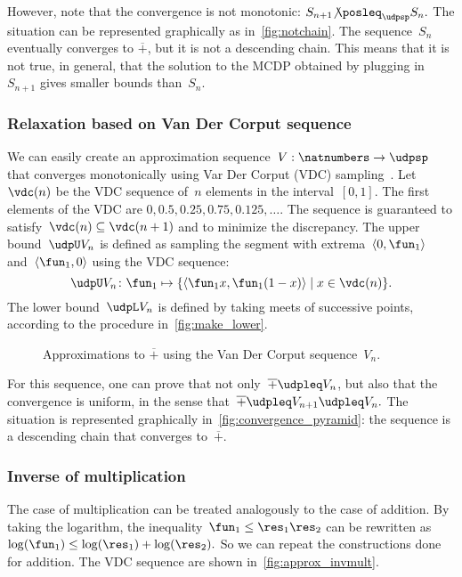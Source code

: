 However, note that the convergence is not monotonic: $S_{n+1}{\not\posleq}_{\udpsp}S_{n}.
$
The situation can be represented graphically as in~\cref{fig:notchain}.
The sequence~$S_{n}$ eventually converges to $\overline{+}$, but
it is not a descending chain.
This means that it is not true, in general,
that the solution to the MCDP obtained by plugging in~$S_{n+1}$
gives smaller bounds than~$S_{n}$.

\subsubsection*{Relaxation based on Van Der Corput sequence}

We can easily create an approximation sequence~$V:\natnumbers\to\udpsp$
that converges monotonically using Var Der Corput (VDC) sampling~\cite[Section 5.2]{LaValle2006Planning}.
Let~$\vdc(n)$ be the VDC sequence of~$n$ elements in the interval~$[0,1]$.
The first elements of the VDC are $0,0.5,0.25,0.75,0.125,\dots$.
The sequence is guaranteed to satisfy~$\vdc(n)\subseteq\vdc(n+1)$
and to minimize the discrepancy.
The upper bound~$\udpU V_{n}$
is defined as sampling the segment with extrema~$\left\langle 0,\fun_{1}\right\rangle $
and~$\left\langle \fun_{1},0\right\rangle $ using the VDC sequence:
\[
	\udpU V_{n}\colon\fun_{1}\mapsto\{\left\langle \fun_{1}x,\fun_{1}(1-x)\right\rangle \mid x\in\vdc(n)\}.
\]
The lower bound~$\udpL V_{n}$ is defined by taking meets of successive
points, according to the procedure in~\cref{fig:make_lower}.

\begin{figure}[h]
	\centering
	\caption{Approximations to $\overline{+}$ using the Van Der
		Corput sequence~$V_{n}$.}
	\label{fig:Vn}
\end{figure}

For this sequence, one can prove that not only~$\overline{+}\udpleq V_{n}$,
but also that the convergence is uniform, in the sense that~$\overline{+}\udpleq V_{n+1}\udpleq V_{n}.
$
The situation is represented graphically in~\cref{fig:convergence_pyramid}:
the sequence is a descending chain that converges to~$\overline{+}$.

\subsubsection{Inverse of multiplication}

The case of multiplication can be treated analogously to the case
of addition.
By taking the logarithm, the inequality~$\fun_{1}\leq\res_{1}\res_{2}$
can be rewritten as~$\log(\fun_{1})\leq\log(\res_{1})+\log(\res_{2}).
$
So we can repeat the constructions done for addition.
The VDC sequence
are shown in~\cref{fig:approx_invmult}.

